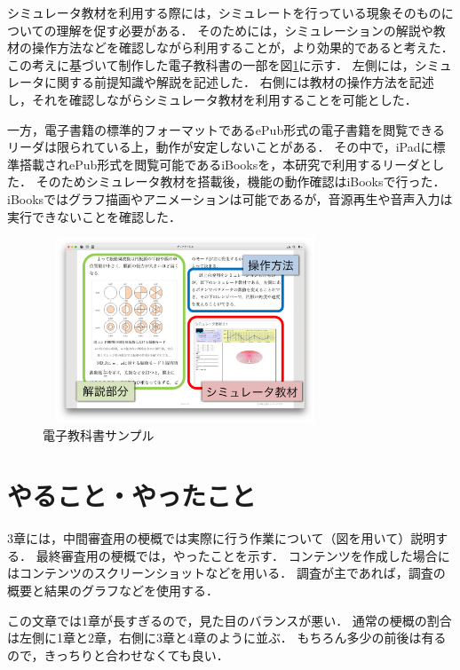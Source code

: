 \documentclass[twocolumn,10pt,a4j]{jsarticle}
\begin{document}
シミュレータ教材を利用する際には，シミュレートを行っている現象そのものについての理解を促す必要がある．
そのためには，シミュレーションの解説や教材の操作方法などを確認しながら利用することが，より効果的であると考えた．
この考えに基づいて制作した電子教科書の一部を図\ref{fig:教科書}に示す．
左側には，シミュレータに関する前提知識や解説を記述した．
右側には教材の操作方法を記述し，それを確認しながらシミュレータ教材を利用することを可能とした．

一方，電子書籍の標準的フォーマットであるePub形式の電子書籍を閲覧できるリーダは限られている上，動作が安定しないことがある．
その中で，iPadに標準搭載されePub形式を閲覧可能であるiBooksを，本研究で利用するリーダとした．
そのためシミュレータ教材を搭載後，機能の動作確認はiBooksで行った．
iBooksではグラフ描画やアニメーションは可能であるが，音源再生や音声入力は実行できないことを確認した．%

\begin{figure}[h]
\begin{center}
 \includegraphics[clip,width=85mm,height=55mm]{textbook.pdf}
\end{center}
 \caption{電子教科書サンプル}
 \label{fig:教科書}
\end{figure}

\section{やること・やったこと}

3章には，中間審査用の梗概では実際に行う作業について（図を用いて）説明する．
最終審査用の梗概では，やったことを示す．
コンテンツを作成した場合にはコンテンツのスクリーンショットなどを用いる．
調査が主であれば，調査の概要と結果のグラフなどを使用する．

この文章では1章が長すぎるので，見た目のバランスが悪い．
通常の梗概の割合は左側に1章と2章，右側に3章と4章のように並ぶ．
もちろん多少の前後は有るので，きっちりと合わせなくても良い．
\end{document}
